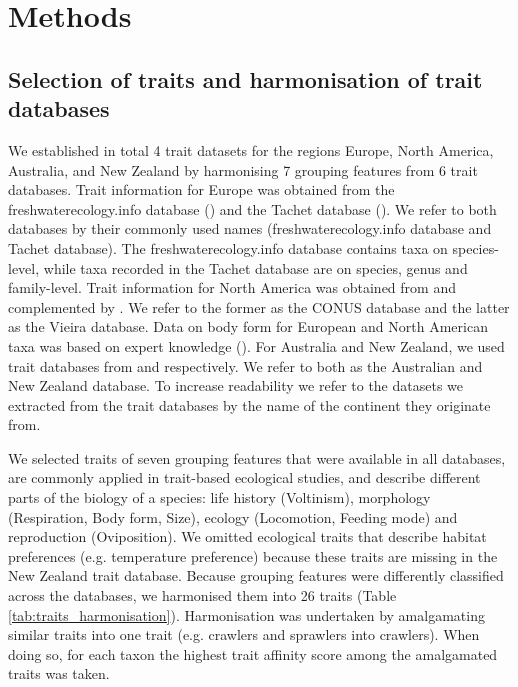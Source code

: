 \documentclass{article}
\begin{document}
\newpage

\section*{Methods}

\subsection*{Selection of traits and harmonisation of trait databases}

We established in total 4 trait datasets for the regions Europe, North America, Australia, and New Zealand by harmonising 7 grouping features from 6 trait databases. Trait information for Europe was obtained from the freshwaterecology.info database (\cite{schmidt-kloiber_www.freshwaterecology.info_2015}) and the Tachet database (\cite{ussegliopolatera_biological_2000}). We refer to both databases by their commonly used names (freshwaterecology.info database and Tachet database). The freshwaterecology.info database contains taxa on species-level, while taxa recorded in the Tachet database are on species, genus and family-level. Trait information for North America was obtained from \citet{twardochleb_freshwater_nodate} and complemented by \citet{vieira_database_nodate}. We refer to the former as the CONUS database and the latter as the Vieira database. Data on body form for European and North American taxa was based on expert knowledge (\cite{polatera_personal_information_2020}). For Australia and New Zealand, we used trait databases from \citet{kefford_integrated_2020} and \citet{Philips_and_Smith_NZ_DB_2018} respectively. We refer to both as the Australian and New Zealand database. To increase readability we refer to the datasets we extracted from the trait databases by the name of the continent they originate from. 
 
We selected traits of seven grouping features that were available in all databases, are commonly applied in trait-based ecological studies, and describe different parts of the biology of a species: life history (Voltinism), morphology (Respiration, Body form, Size), ecology (Locomotion, Feeding mode) and reproduction (Oviposition). We omitted ecological traits that describe habitat preferences (e.g. temperature preference) because these traits are missing in the New Zealand trait database. Because grouping features were differently classified across the databases, we harmonised them into 26 traits (Table \ref{tab:traits_harmonisation}). Harmonisation was undertaken by amalgamating similar traits into one trait (e.g. crawlers and sprawlers into crawlers). When doing so, for each taxon the highest trait affinity score among the amalgamated traits was taken. 
\end{document}
